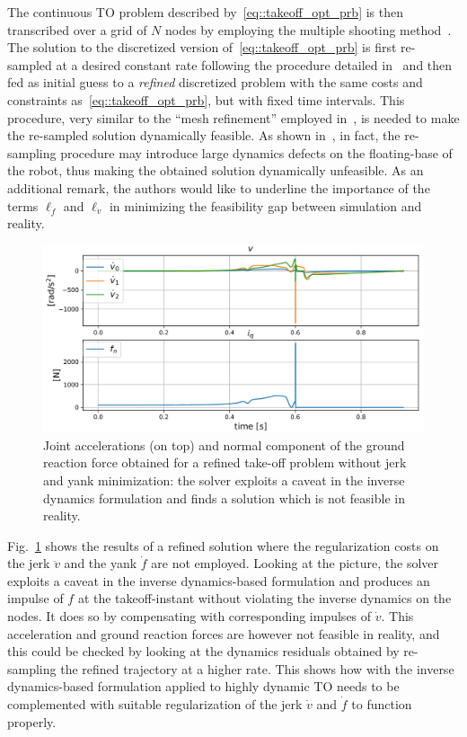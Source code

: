The continuous TO problem described by~\ref{eq::takeoff_opt_prb} is then transcribed over a grid of $N$ nodes by employing the multiple shooting method~\cite{to::bock1984multiple}. The solution to the discretized version of~\eqref{eq::takeoff_opt_prb} is first re-sampled at a desired constant rate following the procedure detailed in~\cite{to::horizon_to} and then fed as initial guess to a \textit{refined} discretized problem with the same costs and constraints as~\eqref{eq::takeoff_opt_prb}, but with fixed time intervals. This procedure, very similar to the \enquote{mesh refinement} employed in~\cite{to::horizon_to}, is needed to make the re-sampled solution dynamically feasible. As shown in~\cite{to::horizon_to}, in fact, the re-sampling procedure may introduce large dynamics defects on the floating-base of the robot, thus making the obtained solution dynamically unfeasible. 
As an additional remark, the authors would like to underline the importance of the terms $\ell_{\dot{f}}$ and $\ell_{\ddot{v}}$ in minimizing the feasibility gap between simulation and reality.
\begin{figure}[t]
    \centering
    \includegraphics[width=1\columnwidth]{images/inv_dyn_caveat.pdf}
    \caption{Joint accelerations (on top) and normal component of the ground reaction force obtained for a refined take-off problem without jerk and yank minimization: the solver exploits a caveat in the inverse dynamics formulation and finds a solution which is not feasible in reality.}
    \label{fig:inv_dyn_caveat}
\end{figure}
Fig.~\ref{fig:inv_dyn_caveat} shows the results of a refined solution where the regularization costs on the jerk $\ddot{v}$ and the yank $\dot{f}$ are not employed. Looking at the picture, the solver exploits a caveat in the inverse dynamics-based formulation and produces an impulse of $f$ at the takeoff-instant without violating the inverse dynamics on the nodes. It does so by compensating with corresponding impulses of $\dot{v}$. This acceleration and ground reaction forces are however not feasible in reality, and this could be checked by looking at the dynamics residuals obtained by re-sampling the refined trajectory at a higher rate. This shows how with the inverse dynamics-based formulation applied to highly dynamic TO needs to be complemented with suitable regularization of the jerk $\dot{v}$ and $\dot{f}$ to function properly.
